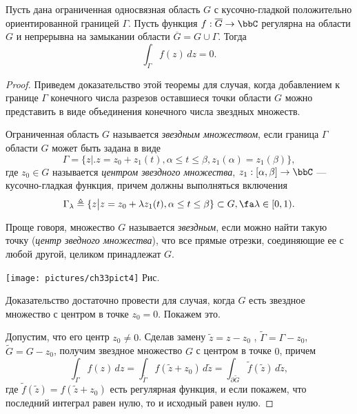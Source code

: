 \begin{thm}\label{abcd1}
Пусть дана ограниченная односвязная область $G$ с кусочно-гладкой положительно ориентированной границей $\Gamma$. Пусть функция $f:\overline{G}\to\bbC$ регулярна на области $G$ и непрерывна на замыкании области $\overline{G}=G\cup\Gamma$. Тогда
\begin{equation}
\label{abc10}
\int_{\Gamma} f(z)\,dz = 0.
\end{equation}
\end{thm}
\begin{proof}
Приведем доказательство этой теоремы для случая, когда добавлением к границе $\Gamma$ конечного числа разрезов оставшиеся точки области $G$ можно представить в виде объединения конечного числа звездных множеств. 
\begin{defn}
\label{abc8}
Ограниченная область $G$ называется \textit{звездным множеством}, если граница $\Gamma$ области $G$ может быть задана в виде
\begin{equation}
\label{abc5}
\Gamma = \{ z \bigr|\bigl. z = z_0+z_1(t),  \alpha \le t \le \beta, z_1(\alpha) = z_1 (\beta) \},
\end{equation} 
где $z_0 \in G$ называется \textit{центром звездного множества}, $z_1 :[\alpha, \beta] \to \bbC$ --- кусочно-гладкая функция, причем должны выполняться включения
\begin{equation}
\label{abc7}
\Gamma_\lambda \triangleq \{ z \bigr|\bigl. z = z_0+\lambda z_1(t),  \alpha \le t \le \beta\} \subset G, \fa \lambda \in [0,1).
\end{equation}

Проще говоря, множество $G$ называется \textit{звездным}, если можно найти такую точку (\textit{центр зведного множества}), что все прямые отрезки, соединяющие ее с любой другой, целиком принадлежат $G$.
\end{defn}
\begin{center}
\texttt{[image: pictures/ch33pict4]} Рис. \thepictnumber
\end{center}

Доказательство достаточно провести для случая, когда $G$ есть звездное множество с центром в точке $z_0 = 0$. Покажем это. 

Допустим, что его центр $z_0 \ne 0$. Сделав  замену $\tilde z = z - z_0$ , $\tilde \Gamma = \Gamma - z_0$, $\tilde{G} = G - z_0$, получим звездное множество $G$ с центром в точке $0$, причем
$$
\int_{\Gamma} f(z)\,dz = \int_{\tilde \Gamma} f(\tilde z +z_0)\,d\tilde z = \int_{\partial\tilde G} \tilde f(\tilde z)\,d\tilde z ,
$$
где $\tilde f(\tilde z) = f(\tilde z + z_0 )$ есть регулярная функция, и если покажем, что последний интеграл равен нулю, то и исходный равен нулю.


\end{proof}
